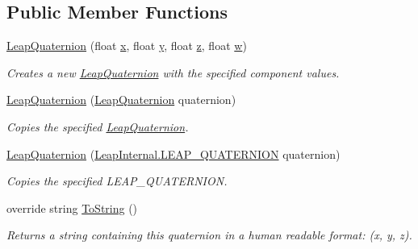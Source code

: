 \subsection*{Public Member Functions}
\begin{DoxyCompactItemize}
\item 
\mbox{\hyperlink{struct_leap_1_1_leap_quaternion_ad357d24e097721fe94ed64bb349d74ad}{Leap\+Quaternion}} (float \mbox{\hyperlink{struct_leap_1_1_leap_quaternion_a59fb70e8250b55c3a1ceb17f3ecfc4ff}{x}}, float \mbox{\hyperlink{struct_leap_1_1_leap_quaternion_abbf57cb8408118a670c43e4713bf86ff}{y}}, float \mbox{\hyperlink{struct_leap_1_1_leap_quaternion_a518972acd244231b413504c2d441445f}{z}}, float \mbox{\hyperlink{struct_leap_1_1_leap_quaternion_a81a812c8073171912309baabca03146f}{w}})
\begin{DoxyCompactList}\small\item\em Creates a new \mbox{\hyperlink{struct_leap_1_1_leap_quaternion}{Leap\+Quaternion}} with the specified component values. \end{DoxyCompactList}\item 
\mbox{\hyperlink{struct_leap_1_1_leap_quaternion_a84f12596d668c2f5448a55dcbda52057}{Leap\+Quaternion}} (\mbox{\hyperlink{struct_leap_1_1_leap_quaternion}{Leap\+Quaternion}} quaternion)
\begin{DoxyCompactList}\small\item\em Copies the specified \mbox{\hyperlink{struct_leap_1_1_leap_quaternion}{Leap\+Quaternion}}. \end{DoxyCompactList}\item 
\mbox{\hyperlink{struct_leap_1_1_leap_quaternion_a6c606ed0513cfbc84cd820ffdd993cb0}{Leap\+Quaternion}} (\mbox{\hyperlink{struct_leap_internal_1_1_l_e_a_p___q_u_a_t_e_r_n_i_o_n}{Leap\+Internal.\+L\+E\+A\+P\+\_\+\+Q\+U\+A\+T\+E\+R\+N\+I\+ON}} quaternion)
\begin{DoxyCompactList}\small\item\em Copies the specified L\+E\+A\+P\+\_\+\+Q\+U\+A\+T\+E\+R\+N\+I\+ON. \end{DoxyCompactList}\item 
override string \mbox{\hyperlink{struct_leap_1_1_leap_quaternion_af4a1e8e78b01fc8c0d28a9dc121a5a8f}{To\+String}} ()
\begin{DoxyCompactList}\small\item\em Returns a string containing this quaternion in a human readable format\+: (x, y, z). \end{DoxyCompactList}\item 

\end{DoxyCompactItemize}
